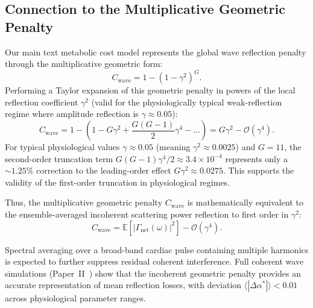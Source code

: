 \subsection{Connection to the Multiplicative Geometric Penalty}

Our main text metabolic cost model represents the global wave reflection penalty
through the multiplicative geometric form:
\begin{equation}
    C_{\mathrm{wave}} = 1 - (1 - \gamma^2)^G.
\end{equation}
Performing a Taylor expansion of this geometric penalty in powers of the local
reflection coefficient $\gamma^2$ (valid for the physiologically typical
weak-reflection regime where amplitude reflection is $\gamma \approx 0.05$):
\begin{equation}
    C_{\mathrm{wave}} = 1 - \left( 1 - G \gamma^2 + \frac{G(G-1)}{2} \gamma^4 - \dots \right) = G \gamma^2 - \mathcal{O}(\gamma^4).
\end{equation}
For typical physiological values $\gamma \approx 0.05$ (meaning $\gamma^2
\approx 0.0025$) and $G = 11$, the second-order truncation term
$G(G-1)\gamma^4/2 \approx 3.4 \times 10^{-4}$ represents only a $\sim 1.25\%$
correction to the leading-order effect $G\gamma^2 \approx 0.0275$. This
supports the validity of the first-order truncation in physiological
regimes.

Thus, the multiplicative geometric penalty $C_{\mathrm{wave}}$ is mathematically
equivalent to the ensemble-averaged incoherent scattering power reflection to
first order in $\gamma^2$:
\begin{equation}
    C_{\mathrm{wave}} = \mathbb{E}\left[ |\Gamma_{\mathrm{net}}(\omega)|^2 \right] - \mathcal{O}(\gamma^4).
\end{equation}

Spectral averaging over a broad-band cardiac pulse containing multiple harmonics
is expected to further suppress residual coherent interference. Full coherent
wave simulations (Paper~II~\cite{paperII}) show that the incoherent
geometric penalty provides an accurate representation of mean reflection losses,
with deviation $\langle |\Delta\alpha^*| \rangle < 0.01$ across physiological
parameter ranges.
